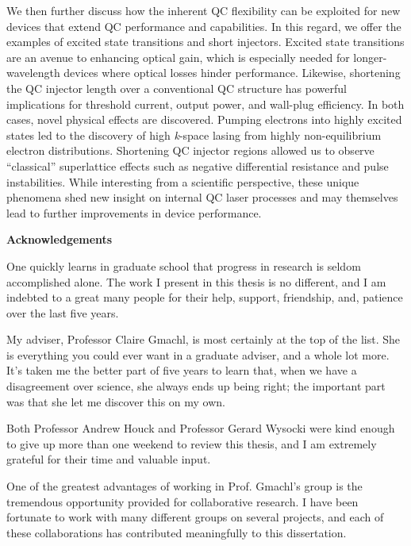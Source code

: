 We then further discuss how the inherent QC flexibility can be exploited for new devices that extend QC performance and capabilities.  In this regard, we offer the examples of excited state transitions and short injectors.  Excited state transitions are an avenue to enhancing optical gain, which is especially needed for longer-wavelength devices where optical losses hinder performance.  Likewise, shortening the QC injector length over a conventional QC structure has powerful implications for threshold current, output power, and wall-plug efficiency.  In both cases, novel physical effects are discovered.  Pumping electrons into highly excited states led to the discovery of high \emph{k}-space lasing from highly non-equilibrium electron distributions.  Shortening QC injector regions allowed us to observe ``classical'' superlattice effects such as negative differential resistance and pulse instabilities.  While interesting from a scientific perspective, these unique phenomena shed new insight on internal QC laser processes and may themselves lead to further improvements in device performance.

\clearpage

\cleardoublepage

\begin{center}
    \Large \textbf{Acknowledgements}
\end{center}

One quickly learns in graduate school that progress in research is seldom accomplished alone.  The work I present in this thesis is no different, and I am indebted to a great many people for their help, support, friendship, and, patience over the last five years.

My adviser, Professor Claire Gmachl, is most certainly at the top of the list. She is everything you could ever want in a graduate adviser, and a whole lot more.  It's taken me the better part of five years to learn that, when we have a disagreement over science, she always ends up being right; the important part was that she let me discover this on my own.

Both Professor Andrew Houck and Professor Gerard Wysocki were kind enough to give up more than one weekend to review this thesis, and I am extremely grateful for their time and valuable input.

One of the greatest advantages of working in Prof. Gmachl's group is the tremendous opportunity provided for collaborative research.  I have been fortunate to work with many different groups on several projects, and each of these collaborations has contributed meaningfully to this dissertation.


